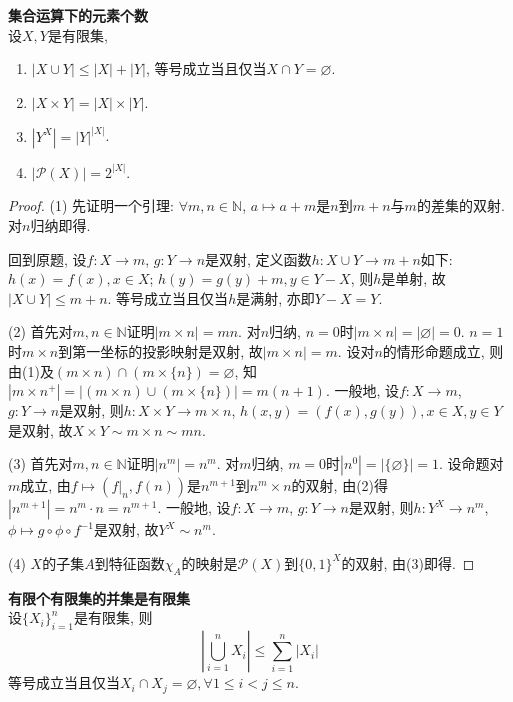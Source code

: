 \begin{pro} \textbf{集合运算下的元素个数}\\
设$X,Y$是有限集, 
\begin{enumerate}
    \item $|X\cup Y|\le |X|+|Y|$, 等号成立当且仅当$X\cap Y=\varnothing$. 
    \item $|X\times Y|= |X|\times |Y|$.
    \item $|Y^X|=|Y|^{|X|}$.
    \item $|\mathcal{P}(X)|=2^{|X|}$.
\end{enumerate}
\label{pro:setsize}
\end{pro}
\begin{proof}
\par (1) 先证明一个引理: $\forall m,n\in \mathbb{N}$, $a\mapsto a+m$是$n$到$m+n$与$m$的差集的双射. 对$n$归纳即得. 
\par 回到原题, 设$f:X\to m$, $g:Y\to n$是双射, 定义函数$h:X\cup Y\to m+n$如下: $h(x)=f(x), x\in X$; $h(y)=g(y)+m, y\in Y-X$, 则$h$是单射, 故$|X\cup Y|\le m+n$. 等号成立当且仅当$h$是满射, 亦即$Y-X=Y$. 
\par (2) 首先对$m,n\in \mathbb{N}$证明$|m\times n|= mn$. 对$n$归纳, $n=0$时$|m\times n| = |\varnothing|= 0$. $n=1$时$m\times n$到第一坐标的投影映射是双射, 故$|m\times n| = m$. 设对$n$的情形命题成立, 则由(1)及$(m\times n)\cap (m \times \{n\})=\varnothing$, 知$|m\times n^+|=|(m\times n)\cup (m \times \{n\})|=m(n+1)$. 一般地, 设$f:X\to m$, $g:Y\to n$是双射, 则$h:X\times Y\to m\times n$, $h(x,y)=(f(x),g(y)), x\in X, y\in Y$是双射, 故$X\times Y\sim m\times n \sim mn$.
\par (3) 首先对$m,n\in \mathbb{N}$证明$|n^m|= n^m$. 对$m$归纳, $m=0$时$|n^0| = |\{\varnothing\}|= 1$. 设命题对$m$成立, 由$f\mapsto (f\vert_n, f(n))$是$n^{m+1}$到$n^m \times n$的双射, 由(2)得$|n^{m+1}|=n^m\cdot n=n^{m+1}$. 一般地, 设$f:X\to m$, $g:Y\to n$是双射, 则$h:Y^X\to n^m$, $\phi\mapsto g\circ \phi \circ f^{-1}$是双射, 故$Y^X\sim n^m$.
\par (4) $X$的子集$A$到特征函数$\chi_A$的映射是$\mathcal{P}(X)$到${\{0,1\}}^X$的双射, 由(3)即得. 
\end{proof}

\begin{col} \textbf{有限个有限集的并集是有限集}\\
设$\{X_i\}_{i=1}^n$是有限集, 则
\begin{equation}
    \left\vert \bigcup_{i=1}^n X_i\right\vert \le \sum_{i=1}^n \vert X_i\vert 
\end{equation}
等号成立当且仅当$X_i \cap X_j=\varnothing, \forall 1\le i<j \le n$.
\end{col}

